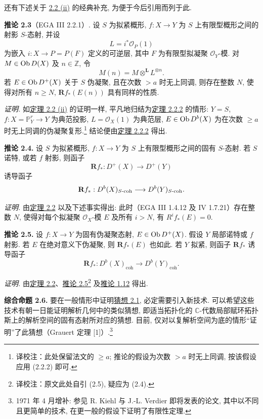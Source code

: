 还有下述关于 \hyperlink{sga6.e03.thm.2-2}{2.2 (ii)} 的经典补充, 为便于今后引用而列于此.

\textbf{推论 2.3}（EGA III 2.2.1）. 设 \(S\) 为拟紧概形, \(f:X\to Y\) 为 $S$ 上有限型概形之间的射影 \(S\)-态射, 并设
\[
  L=i^*\mathcal O_P(1)
\]
为嵌入 \(i:X\to P=P(F)\) 定义的可逆层, 其中 \(F\) 为有限型拟凝聚 \(\mathcal O_Y\)-模. 对 \(M\in \operatorname{Ob} D(X)\) 及 \(n\in\mathbb Z\), 令
\[
  M(n)=M\otimes^{\mathbf L}L^{\otimes n}.
\]
若 \(E\in \operatorname{Ob} D^+(X)\) 关于 \(S\) 伪凝聚, 且在次数 \(>a\) 时无上同调, 则存在整数 \(N\), 使得对所有 \(n\geq N\), \(\mathbf Rf_*(E(n))\) 具有同样的性质.

\emph{证明.} 如\hyperlink{sga6.e03.thm.2-2}{定理 2.2 (ii)} 的证明一样, 平凡地归结为\hyperlink{sga6.e03.thm.2-2-2}{定理 2.2.2} 的情形: \(Y=S\), \(f:X=\mathbb P^r_Y\to Y\) 为典范投影, \(L=\mathcal O_X(1)\) 为典范层, \(E\in\operatorname{Ob} D^b(X)\) 为在次数 \(\geq a\) 时无上同调的伪凝聚复形.\footnote{译校注：此处保留法文的 $\geq a$; 推论的假设为次数 $>a$ 时无上同调, 按该假设应用 (2.2.2) 即可.} 结论便由\hyperlink{sga6.e03.thm.2-2-2}{定理 2.2.2} 得出.

\textbf{推论 2.4.} 设 \(S\) 为拟紧概形, \(f:X\to Y\) 为 $S$ 上有限型概形之间的固有 \(S\)-态射. 若 \(S\) 诺特, 或若 \(f\) 射影, 则函子
\[
  \mathbf Rf_*:D^+(X)\longrightarrow D^+(Y)
\]
诱导函子
\[
  \mathbf Rf_*:D^b(X)_{S\text{-}\mathrm{coh}}\longrightarrow D^b(Y)_{S\text{-}\mathrm{coh}}.
\]

\emph{证明.} 由\hyperlink{sga6.e03.thm.2-2}{定理 2.2} 以及下述事实得出: 此时（EGA III 1.4.12 及 IV 1.7.21）存在整数 \(N\), 使得对每个拟凝聚 \(\mathcal O_X\)-模 \(E\) 及所有 \(i>N\), 有 \(R^if_*(E)=0\).

\textbf{推论 2.5.} 设 \(f:X\to Y\) 为固有伪凝聚态射, \(E\in \operatorname{Ob} D^+(X)\). 假设 \(Y\) 局部诺特或 \(f\) 射影. 若 \(E\) 在绝对意义下伪凝聚, 则 \(\mathbf Rf_*(E)\) 也如此. 若 \(Y\) 拟紧, 则函子 \(\mathbf Rf_*\) 诱导函子
\[
  \mathbf Rf_*:D^b(X)_{\mathrm{coh}}\longrightarrow D^b(Y)_{\mathrm{coh}}.
\]

\emph{证明.} 由\hyperlink{sga6.e03.thm.2-2}{定理 2.2}、\hyperlink{sga6.e03.cor.2-5}{推论 2.5}\footnote{译校注：原文此处自引 (2.5), 疑应为 (2.4).} 及\hyperlink{sga6.e03.cor.1-12}{推论 1.12} 得出.

\textbf{综合命题 2.6.} 要在一般情形中证明\hyperlink{sga6.e03.conj.2-1}{猜想 2.1}, 必定需要引入新技术. 可以希望这些技术有朝一日能证明解析几何中的类似猜想, 即适当拓扑化的 $\mathbb C$-代数局部赋环拓扑斯上的解析空间的固有态射所对应的猜想. 目前, 仅对以复解析空间为底的情形“证明”了此猜想（Grauert 定理 [1]）.\footnote{1971 年 4 月增补: 参见 R. Kiehl 与 J.-L. Verdier 即将发表的论文, 其中以不同且更简单的技术, 在更一般的假设下证明了有限性定理.}

